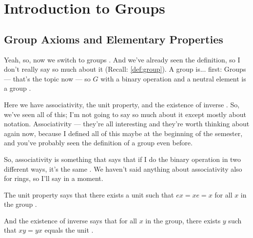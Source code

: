 \section{Introduction to Groups}

\subsection{Group Axioms and Elementary Properties}

\begin{speech}[00:44:10 - 00:45:56]
Yeah, so, now we switch to groups . And we've already seen the definition, so I don't really say so much about it (Recall: \cref{def:group}). A group is... first: Groups --- that's the topic now  --- so $G$ with a binary operation and a neutral element is a group .

Here we have associativity, the unit property, and the existence of inverse . So, we've seen all of this; I'm not going to say so much about it except mostly about notation. Associativity --- they're all interesting and they're worth thinking about again now, because I defined all of this maybe at the beginning of the semester, and you've probably seen the definition of a group even before.

So, associativity is something that says that if I do the binary operation in two different ways, it's the same . We haven't said anything about associativity also for rings, so I'll say in a moment.

The unit property says that there exists a unit such that $ex = xe = x$ for all $x$ in the group .

And the existence of inverse says that for all $x$ in the group, there exists $y$ such that $xy = yx$ equals the unit .
\end{speech}

